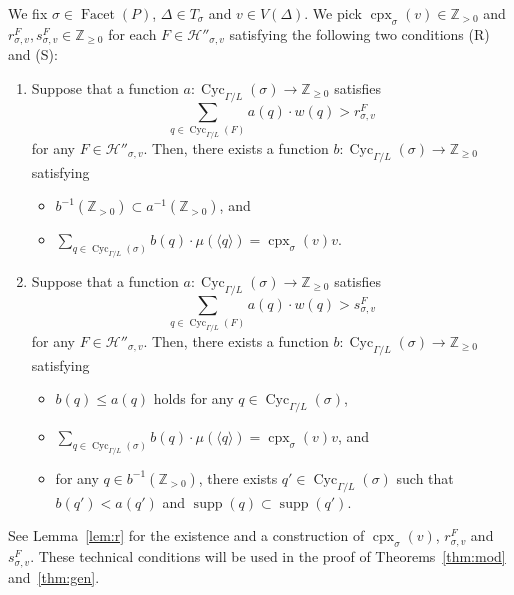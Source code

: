 We fix $\sigma \in \operatorname{Facet}(P)$, $\Delta \in T_{\sigma}$ and $v \in V(\Delta)$. 
We pick $\operatorname{cpx}_{\sigma}(v) \in \mathbb{Z}_{> 0}$ and 
$r^{F} _{\sigma, v}, s^{F} _{\sigma, v} \in \mathbb{Z}_{\ge 0}$ for each $F \in \mathcal{H}'' _{\sigma, v}$ 
satisfying the following two conditions (R) and (S):
\begin{enumerate}
\item[(R)] 
Suppose that a function $a: \operatorname{Cyc}_{\Gamma /L}(\sigma) \to \mathbb{Z}_{\ge 0}$ satisfies 
\[
\sum _{q \in \operatorname{Cyc}_{\Gamma /L}(F)} a(q) \cdot w(q) > r^{F} _{\sigma, v}
\]
for any $F \in \mathcal{H}'' _{\sigma, v}$. 
Then, there exists a function $b: \operatorname{Cyc}_{\Gamma /L}(\sigma) \to \mathbb{Z}_{\ge 0}$ 
satisfying 
\begin{itemize}
\item 
$b^{-1}(\mathbb{Z}_{>0}) \subset a^{-1}(\mathbb{Z}_{>0})$, and

\item
$\sum _{q \in \operatorname{Cyc}_{\Gamma /L}(\sigma)} b(q) \cdot \mu(\langle q \rangle) = \operatorname{cpx}_{\sigma}(v) v$. 
\end{itemize}

\item[(S)] 
Suppose that a function $a: \operatorname{Cyc}_{\Gamma /L}(\sigma) \to \mathbb{Z}_{\ge 0}$ satisfies 
\[
\sum _{q \in \operatorname{Cyc}_{\Gamma /L}(F)} a(q) \cdot w(q) > s^{F} _{\sigma, v}
\]
for any $F \in \mathcal{H}'' _{\sigma, v}$. 
Then, there exists a function $b: \operatorname{Cyc}_{\Gamma /L}(\sigma) \to \mathbb{Z}_{\ge 0}$ 
satisfying 
\begin{itemize}
\item 
$b(q) \le a(q)$ holds for any $q \in \operatorname{Cyc}_{\Gamma /L}(\sigma)$, 

\item 
$\sum _{q \in \operatorname{Cyc}_{\Gamma /L}(\sigma)} b(q) \cdot \mu(\langle q \rangle) = \operatorname{cpx}_{\sigma}(v) v$, and 

\item
for any $q \in b^{-1}(\mathbb{Z}_{>0})$, 
there exists $q' \in \operatorname{Cyc}_{\Gamma /L}(\sigma)$ 
such that $b(q') < a(q')$ and $\operatorname{supp}(q) \subset \operatorname{supp}(q')$.
\end{itemize}
\end{enumerate}

\noindent
See Lemma~\ref{lem:r} for the existence and a construction of $\operatorname{cpx}_{\sigma}(v)$, 
$r^{F} _{\sigma, v}$ and $s^{F} _{\sigma, v}$. 
These technical conditions will be used in the proof of Theorems~\ref{thm:mod} and~\ref{thm:gen}. 

